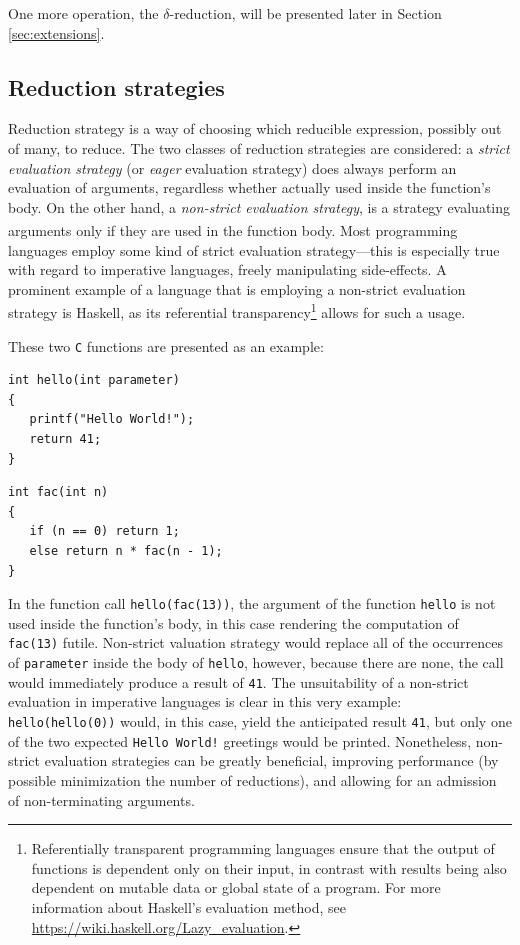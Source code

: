 \documentclass[table, a4paper, 10pt]{book}
\newcommand{\cit}[1]{\textsuperscript{\cite{#1}}}
\begin{document}
\noindent
One more operation, the $\delta$-reduction, will be presented later in Section \ref{sec:extensions}.

\subsection{Reduction strategies}
Reduction strategy is a way of choosing which reducible expression, possibly out of many,
to reduce. The two classes of reduction strategies are considered:
a \textit{strict evaluation strategy} (or \textit{eager} evaluation strategy) does always perform an evaluation of arguments, regardless whether actually
used inside the function's body. On the other hand, a \textit{non-strict evaluation strategy},
is a strategy
evaluating arguments only if they are used in the function body.\cit{pierce} Most programming languages employ
some kind of strict evaluation strategy---this is especially true with regard to imperative languages,
freely manipulating side-effects. A prominent example of a language that is employing a non-strict
evaluation strategy is Haskell, as its referential transparency\footnote{Referentially transparent programming languages
ensure that the output of functions is dependent only on their input, in contrast with
results being also dependent on mutable data or global state of a program.
For more information about Haskell's evaluation method, see \url{https://wiki.haskell.org/Lazy_evaluation}.} allows for such a usage.

\vspace{0.1cm}
\noindent
These two \texttt{C} functions are presented as an example:
\vspace{-0.3cm}
\begin{multicols}{2}
\begin{lstlisting}
int hello(int parameter)
{
   printf("Hello World!");
   return 41;
}
\end{lstlisting}
\columnbreak
\begin{lstlisting}
int fac(int n)
{
   if (n == 0) return 1;
   else return n * fac(n - 1);
}
\end{lstlisting}
\end{multicols}
\vspace{-0.5cm}
\noindent
In the function call \texttt{hello(fac(13))}, the argument of the
function \texttt{hello} is not used inside the function's body,
in this case rendering the computation of \texttt{fac(13)} futile.
Non-strict valuation strategy would replace all of the occurrences of
\texttt{parameter} inside the body of \texttt{hello}, however, because there are none,
the call would immediately produce a result of \texttt{41}. The unsuitability of
a non-strict evaluation in imperative languages is clear in this very example:
\texttt{hello(hello(0))} would, in this case, yield the anticipated result \texttt{41}, but only one
of the two expected
\texttt{Hello World!} greetings would be printed. Nonetheless, non-strict
evaluation strategies can be greatly beneficial, improving performance (by possible minimization the number of reductions),
and allowing for an admission of non-terminating arguments.
\end{document}
